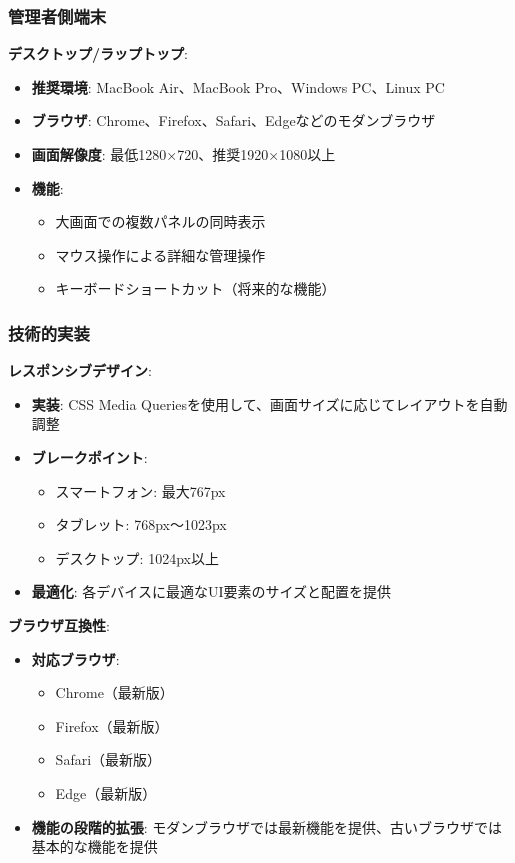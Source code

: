 \documentclass[a4paper,11pt,ja=standard,xelatex]{bxjsarticle}
\theoremstyle{definition}
\begin{document}
\subsubsection{管理者側端末}

\textbf{デスクトップ/ラップトップ}:
\begin{itemize}
\item \textbf{推奨環境}: MacBook Air、MacBook Pro、Windows PC、Linux PC
\item \textbf{ブラウザ}: Chrome、Firefox、Safari、Edgeなどのモダンブラウザ
\item \textbf{画面解像度}: 最低1280×720、推奨1920×1080以上
\item \textbf{機能}: 
  \begin{itemize}
  \item 大画面での複数パネルの同時表示
  \item マウス操作による詳細な管理操作
  \item キーボードショートカット（将来的な機能）
  \end{itemize}
\end{itemize}

\subsubsection{技術的実装}

\textbf{レスポンシブデザイン}:
\begin{itemize}
\item \textbf{実装}: CSS Media Queriesを使用して、画面サイズに応じてレイアウトを自動調整
\item \textbf{ブレークポイント}: 
  \begin{itemize}
  \item スマートフォン: 最大767px
  \item タブレット: 768px〜1023px
  \item デスクトップ: 1024px以上
  \end{itemize}
\item \textbf{最適化}: 各デバイスに最適なUI要素のサイズと配置を提供
\end{itemize}

\textbf{ブラウザ互換性}:
\begin{itemize}
\item \textbf{対応ブラウザ}: 
  \begin{itemize}
  \item Chrome（最新版）
  \item Firefox（最新版）
  \item Safari（最新版）
  \item Edge（最新版）
  \end{itemize}
\item \textbf{機能の段階的拡張}: モダンブラウザでは最新機能を提供、古いブラウザでは基本的な機能を提供
\end{itemize}
\end{document}
